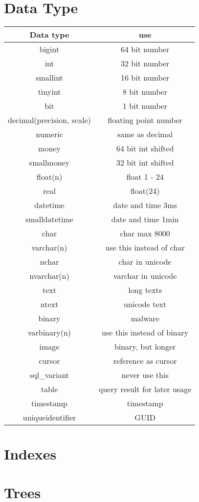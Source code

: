 \documentclass[a4paper,8pt]{article} %
\begin{document}
\begin{small}
\begin{minipage}{0.5\linewidth}
			\section{Data Type}
			\begin{tabular}{c|c}
				Data type	& use\\\hline
				bigint		& 64 bit number\\\hline
				int			& 32 bit number\\\hline
				smallint	& 16 bit number\\\hline
				tinyint		& 8 bit number\\\hline
				bit			& 1 bit number\\\hline
				decimal(precision, scale) & floating point number\\\hline
				numeric		& same as decimal\\\hline
				money		& 64 bit int shifted\\\hline
				smallmoney	& 32 bit int shifted\\\hline
				float(n)	& float 1 - 24\\\hline
				real		& float(24)\\\hline
				datetime	& date and time 3ms\\\hline
				smalldatetime	& date and time 1min\\\hline
				char		& char max 8000\\\hline
				varchar(n)	& use this instead of char\\\hline
				nchar		& char in unicode\\\hline
				nvarchar(n)	& varchar in unicode\\\hline
				text		& long texts\\\hline
				ntext		& unicode text\\\hline
				binary		& malware\\\hline
				varbinary(n)	& use this instead of binary\\\hline
				image		& binary, but longer\\\hline
				cursor		& reference as cursor\\\hline
				sql\_variant	& never use this\\\hline
				table		& query result for later usage\\\hline
				timestamp	& timestamp\\\hline
				uniqueidentifier & GUID\\\hline
			\end{tabular}
		\end{minipage}
		\begin{minipage}{0.5\linewidth}
			\section{Indexes}
			 
		\end{minipage}
	\section{Trees}
	 \end{small}
\end{document}
